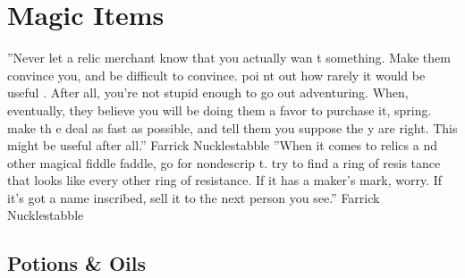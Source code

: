 \documentclass[10pt,a4paper,twoside,bg=print,twocolumn,openany,nodeprecatedcode]{dndbook}
\begin{document}
\chapter{Magic Items}
\DndQuote%
{}
{''Never let a relic merchant know that you actually wan t something. Make them convince you, and be difficult to convince. poi nt out how rarely it would be useful . After all, you're not stupid enough to go out adventuring. When, eventually, they believe you will be doing them a favor to purchase it, spring. make th e deal as fast as possible, and tell them you suppose the y are right. This might be useful after all.''}
{Farrick Nucklestabble}
\DndQuote%
{}
{''When it comes to relics a nd other magical fiddle faddle, go for nondescrip t. try to find a ring of resis tance that looks like every other ring of resistance. If it has a maker's mark, worry. If it's got a name inscribed, sell it to the next person you see.''}
{Farrick Nucklestabble}
\section{Potions \& Oils}
\end{document}
